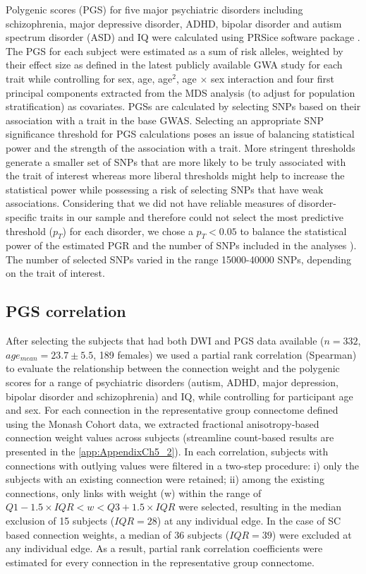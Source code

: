 Polygenic scores (PGS) for five major psychiatric disorders including schizophrenia, major depressive disorder, ADHD, bipolar disorder and autism spectrum disorder (ASD) and IQ were calculated using PRSice software package \citep{Euesden2015}. The PGS for each subject were estimated as a sum of risk alleles, weighted by their effect size as defined in the latest publicly available GWA study for each trait \citep{Neale2010,Ripke2014a,Ruderfer2018,Savage2018,AutismConsortium2017,Wray2018} while controlling for sex, age, age$^{2}$, age $\times$ sex interaction and four first principal components extracted from the MDS analysis (to adjust for population stratification) as covariates. PGSs are calculated by selecting SNPs based on their association with a trait in the base GWAS. Selecting an appropriate SNP significance threshold for PGS calculations poses an issue of balancing statistical power and the strength of the association with a trait. More stringent thresholds generate a smaller set of SNPs that are more likely to be truly associated with the trait of interest whereas more liberal thresholds might help to increase the statistical power while possessing a risk of selecting SNPs that have weak associations. Considering that we did not have reliable measures of disorder-specific traits in our sample and therefore could not select the most predictive threshold ($p_{T}$) for each disorder, we chose a $p_{T}<0.05$ to balance the statistical power of the estimated PGR and the number of SNPs included in the analyses \citep{Ripke2014a}). The number of selected SNPs varied in the range \num{15 000}-\num{40 000} SNPs, depending on the trait of interest. 

\subsection{PGS correlation}

After selecting the subjects that had both DWI and PGS data available ($n= 332$, $age_{mean} = 23.7 \pm 5.5$, 189 females) we used a partial rank correlation (Spearman) to evaluate the relationship between the connection weight and the polygenic scores for a range of psychiatric disorders (autism, ADHD, major depression, bipolar disorder and schizophrenia) and IQ, while controlling for participant age and sex. For each connection in the representative group connectome defined using the Monash Cohort data, we extracted fractional anisotropy-based connection weight values across subjects (streamline count-based results are presented in the \ref{app:AppendixCh5_2}). In each correlation, subjects with connections with outlying values were filtered in a two-step procedure: i) only the subjects with an existing connection were retained; ii) among the existing connections, only links with weight (w) within the range of $Q1-1.5 \times IQR< w <Q3+1.5 \times IQR$ were selected, resulting in the median exclusion of 15 subjects ($IQR = 28$) at any individual edge. In the case of SC based connection weights, a median of 36 subjects ($IQR=39$) were excluded at any individual edge. As a result, partial rank correlation coefficients were estimated for every connection in the representative group connectome. 

